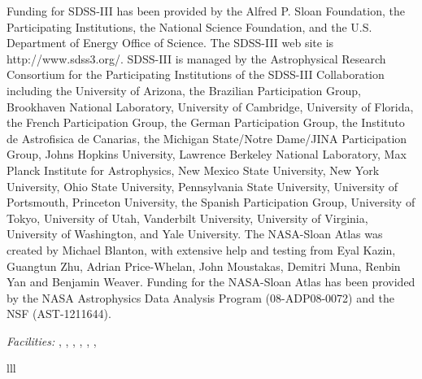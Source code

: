 \documentclass[preprint]{aastex61}
\begin{document}
\begin{acknowledgments}
Funding for SDSS-III has been provided by the Alfred P. Sloan Foundation, the Participating Institutions, the National Science Foundation, and the U.S. Department of Energy Office of Science. The SDSS-III web site is http://www.sdss3.org/. SDSS-III is managed by the Astrophysical Research Consortium for the Participating Institutions of the SDSS-III Collaboration including the University of Arizona, the Brazilian Participation Group, Brookhaven National Laboratory, University of Cambridge, University of Florida, the French Participation Group, the German Participation Group, the Instituto de Astrofisica de Canarias, the Michigan State/Notre Dame/JINA Participation Group, Johns Hopkins University, Lawrence Berkeley National Laboratory, Max Planck Institute for Astrophysics, New Mexico State University, New York University, Ohio State University, Pennsylvania State University, University of Portsmouth, Princeton University, the Spanish Participation Group, University of Tokyo, University of Utah, Vanderbilt University, University of Virginia, University of Washington, and Yale University. The NASA-Sloan Atlas was created by Michael Blanton, with extensive help and testing from Eyal Kazin, Guangtun Zhu, Adrian Price-Whelan, John Moustakas, Demitri Muna, Renbin Yan and Benjamin Weaver. Funding for the NASA-Sloan Atlas has been provided by the NASA Astrophysics Data Analysis Program (08-ADP08-0072) and the NSF (AST-1211644).

{\it Facilities:} , ,  , , , , 

\end{acknowledgments}
 
 
\begin{deluxetable}{lll}
\startdata 

\\
\hline
\enddata
\end{deluxetable}

\end{document}
